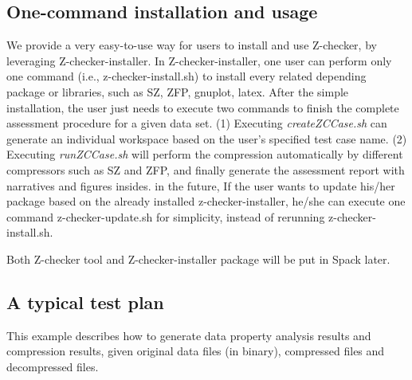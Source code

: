 \subsection{One-command installation and usage}

We provide a very easy-to-use way for users to install and use Z-checker, by leveraging Z-checker-installer. In Z-checker-installer, one user can perform only one command (i.e., z-checker-install.sh) to install every related depending package or libraries, such as SZ, ZFP, gnuplot, latex. After the simple installation, the user just needs to execute two commands to finish the complete assessment procedure for a given data set. (1) Executing \emph{createZCCase.sh} can generate an individual workspace based on the user's specified test case name. (2) Executing \emph{runZCCase.sh} will perform the compression automatically by different compressors such as SZ and ZFP, and finally generate the assessment report with narratives and figures insides.
in the future, If the user wants to update his/her package based on the already installed z-checker-installer, he/she can execute one command z-checker-update.sh for simplicity, instead of rerunning z-checker-install.sh.

Both Z-checker tool and Z-checker-installer package will be put in Spack later.

\subsection{A typical test plan}

This example describes how to generate data property analysis results and compression results, given original data files (in binary), compressed files and decompressed files.

